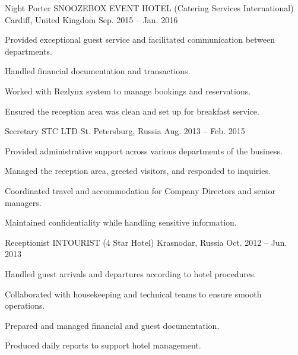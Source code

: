 \begin{cventries}
  \cventry
    {Night Porter} %
    {SNOOZEBOX EVENT HOTEL (Catering Services International)} %
    {Cardiff, United Kingdom} %
    {Sep. 2015 -- Jan. 2016} %
    {
      \begin{cvitems} %
        \item {Provided exceptional guest service and facilitated communication between departments.}
        \item {Handled financial documentation and transactions.}
        \item {Worked with Rezlynx system to manage bookings and reservations.}
        \item {Ensured the reception area was clean and set up for breakfast service.}
      \end{cvitems}
    }

  \cventry
    {Secretary} %
    {STC LTD} %
    {St. Petersburg, Russia} %
    {Aug. 2013 -- Feb. 2015} %
    {
      \begin{cvitems} %
        \item {Provided administrative support across various departments of the business.}
        \item {Managed the reception area, greeted visitors, and responded to inquiries.}
        \item {Coordinated travel and accommodation for Company Directors and senior managers.}
        \item {Maintained confidentiality while handling sensitive information.}
      \end{cvitems}
    }

  \cventry
    {Receptionist} %
    {INTOURIST (4 Star Hotel)} %
    {Krasnodar, Russia} %
    {Oct. 2012 -- Jun. 2013} %
    {
      \begin{cvitems} %
        \item {Handled guest arrivals and departures according to hotel procedures.}
        \item {Collaborated with housekeeping and technical teams to ensure smooth operations.}
        \item {Prepared and managed financial and guest documentation.}
        \item {Produced daily reports to support hotel management.}
      \end{cvitems}
    }


\end{cventries}
